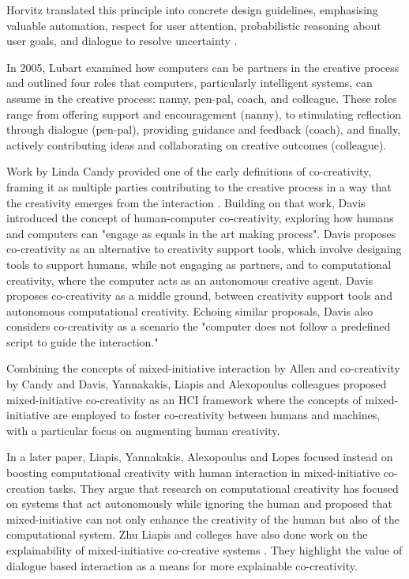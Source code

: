 Horvitz translated this principle into concrete design guidelines, emphasising valuable automation, respect for user attention, probabilistic reasoning about user goals, and dialogue to resolve uncertainty \cite{Horvitz1999-wh}.

In 2005, Lubart \cite{Lubart2005-zi} examined how computers can be partners in the creative process and outlined four roles that computers, particularly intelligent systems, can assume in the creative process: nanny, pen-pal, coach, and colleague. These roles range from offering support and encouragement (nanny), to stimulating reflection through dialogue (pen-pal), providing guidance and feedback (coach), and finally, actively contributing ideas and collaborating on creative outcomes (colleague).

Work by Linda Candy provided one of the early definitions of co-creativity, framing it as multiple parties contributing to the creative process in a way that the creativity emerges from the interaction \cite{Candy2002-ra}. Building on that work, Davis \cite{Davis2013-jy} introduced the concept of human-computer co-creativity, exploring how humans and computers can "engage as equals in the art making process". Davis proposes co-creativity as an alternative to creativity support tools, which involve designing tools to support humans, while not engaging as partners, and to computational creativity, where the computer acts as an autonomous creative agent. Davis proposes co-creativity as a middle ground, between creativity support tools and autonomous computational creativity. Echoing similar proposals, Davis also considers co-creativity as a scenario the "computer does not follow a predefined script to guide the interaction."

Combining the concepts of mixed-initiative interaction by Allen and co-creativity by Candy and Davis, Yannakakis, Liapis and Alexopoulus colleagues proposed mixed-initiative co-creativity \cite{Yannakakis2014-zs, Liapis2016-bv} as an HCI framework where the concepts of mixed-initiative are employed to foster co-creativity between humans and machines, with a particular focus on augmenting human creativity.

In a later paper, Liapis, Yannakakis, Alexopoulus and Lopes \cite{Liapis2016-zt} focused instead on boosting computational creativity with human interaction in mixed-initiative co-creation tasks. They argue that research on computational creativity has focused on systems that act autonomously while ignoring the human and proposed that mixed-initiative can not only enhance the creativity of the human but also of the computational system. Zhu Liapis and colleges have also done work on the explainability of mixed-initiative co-creative systems \cite{Zhu2018-zd}. They highlight the value of dialogue based interaction as a means for more explainable co-creativity. 


